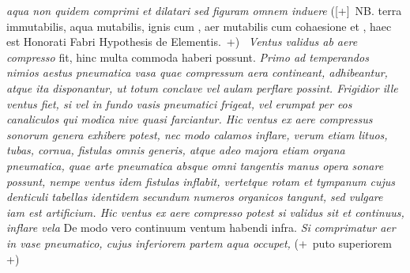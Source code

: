 \textit{aqua non quidem comprimi et dilatari sed figuram omnem induere }
([+]~NB. terra immutabilis, aqua mutabilis, ignis  cum ,
aer mutabilis cum cohaesione et ,
haec est Honorati Fabri\protect{}
Hypothesis de Elementis.~+)  \,
\textit{Ventus\protect{} validus ab aere compresso} fit, hinc multa commoda haberi possunt. 
\textit{Primo ad temperandos nimios aestus pneumatica vasa quae compressum aera contineant, adhibeantur, atque ita disponantur, ut totum conclave vel aulam perflare possint. Frigidior ille ventus fiet, si vel in fundo vasis pneumatici\protect{} 
frigeat, vel erumpat per eos canaliculos qui modica nive quasi farciantur. Hic ventus ex aere compressus 
sonorum genera exhibere potest, nec modo calamos inflare, verum etiam lituos\protect{}, tubas\protect{}, cornua\protect{}, fistulas\protect{} omnis generis, atque adeo majora etiam organa pneumatica\protect{}, quae arte pneumatica absque omni tangentis manus opera sonare possunt, nempe ventus idem fistulas inflabit, vertetque rotam et tympanum cujus denticuli tabellas identidem secundum numeros organicos tangunt, sed vulgare iam est artificium. Hic ventus ex aere compresso potest si validus sit et continuus, inflare vela\protect{} } De modo vero continuum ventum habendi infra. 
\pend
\pstart
%
\textit{Si comprimatur aer in vase pneumatico, cujus inferiorem partem aqua occupet,} (+~puto superiorem +) 
